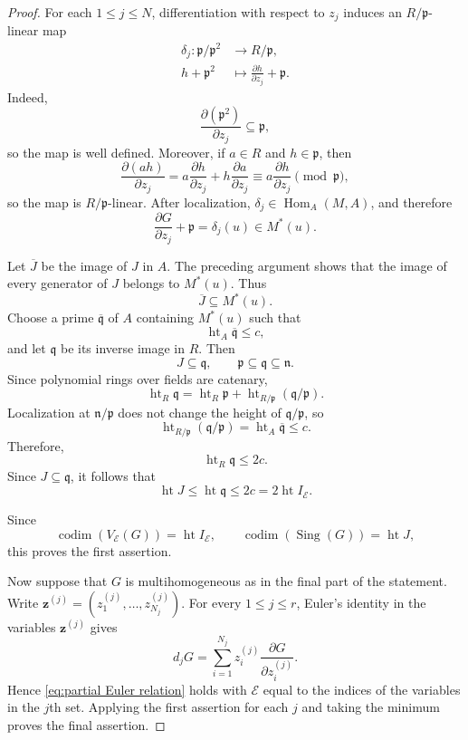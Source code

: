 \documentclass[12pt,reqno]{amsart}
\theoremstyle{definition}
\theoremstyle{remark}
\numberwithin{equation}{section}
\newcommand{\codim}[1]{\operatorname{codim}\left(#1\right)}
\newcommand{\Sing}[1]{\operatorname{Sing}\left(#1\right)}
\def\bfz{{\mathbf z}}
\begin{document}
\begin{proof}
    For each $1\leq j\leq N$, differentiation with respect to $z_j$ induces an
    $R/\mathfrak p$-linear map
    \[
    \begin{aligned}
    \delta_j:\mathfrak p/\mathfrak p^2&\longrightarrow R/\mathfrak p,\\
    h+\mathfrak p^2&\longmapsto
    \frac{\partial h}{\partial z_j}+\mathfrak p.
    \end{aligned}
    \]
    Indeed,
    \[
    \frac{\partial(\mathfrak p^2)}{\partial z_j}\subseteq\mathfrak p,
    \]
    so the map is well defined. Moreover, if $a\in R$ and
    $h\in\mathfrak p$, then
    \[
    \frac{\partial(ah)}{\partial z_j}
    =
    a\frac{\partial h}{\partial z_j}
    +
    h\frac{\partial a}{\partial z_j}
    \equiv
    a\frac{\partial h}{\partial z_j}
    \pmod{\mathfrak p},
    \]
    so the map is $R/\mathfrak p$-linear. After localization,
    $\delta_j\in\operatorname{Hom}_A(M,A)$, and therefore
    \[
    \frac{\partial G}{\partial z_j}+\mathfrak p
    =\delta_j(u)\in M^*(u).
    \]

    Let $\overline J$ be the image of $J$ in $A$. The preceding argument
    shows that the image of every generator of $J$ belongs to $M^*(u)$.
    Thus
    \[
    \overline J\subseteq M^*(u).
    \]
    Choose a prime $\overline{\mathfrak q}$ of $A$ containing $M^*(u)$
    such that
    \[
    \operatorname{ht}_A\overline{\mathfrak q}\leq c,
    \]
    and let $\mathfrak q$ be its inverse image in $R$. Then
    \[
    J\subseteq\mathfrak q,
    \qquad
    \mathfrak p\subseteq\mathfrak q\subseteq\mathfrak n.
    \]
    Since polynomial rings over fields are catenary,
    \[
    \operatorname{ht}_R\mathfrak q
    =
    \operatorname{ht}_R\mathfrak p
    +
    \operatorname{ht}_{R/\mathfrak p}
    (\mathfrak q/\mathfrak p).
    \]
    Localization at $\mathfrak n/\mathfrak p$ does not change the height
    of $\mathfrak q/\mathfrak p$, so
    \[
    \operatorname{ht}_{R/\mathfrak p}(\mathfrak q/\mathfrak p)
    =
    \operatorname{ht}_A\overline{\mathfrak q}
    \leq c.
    \]
    Therefore,
    \[
    \operatorname{ht}_R\mathfrak q\leq 2c.
    \]
    Since $J\subseteq\mathfrak q$, it follows that
    \[
    \operatorname{ht}J
    \leq\operatorname{ht}\mathfrak q
    \leq2c
    =2\operatorname{ht}I_{\mathcal E}.
    \]

    Since
    \[
    \codim{V_{\mathcal E}(G)}=\operatorname{ht}I_{\mathcal E},
    \qquad
    \codim{\Sing{G}}=\operatorname{ht}J,
    \]
    this proves the first assertion.

    Now suppose that $G$ is multihomogeneous as in the final part of the
    statement. Write
    $\bfz^{(j)}=(z^{(j)}_1,\ldots,z^{(j)}_{N_j})$. For every
    $1\leq j\leq r$, Euler's identity in the variables $\bfz^{(j)}$ gives
    \[
    d_jG=\sum_{i=1}^{N_j}
    z^{(j)}_i\frac{\partial G}{\partial z^{(j)}_i}.
    \]
    Hence \eqref{eq:partial Euler relation} holds with $\mathcal E$ equal
    to the indices of the variables in the $j$th set. Applying the first
    assertion for each $j$ and taking the minimum proves the final assertion.
\end{proof}
\end{document}
